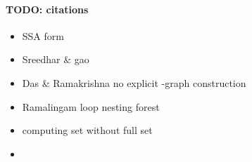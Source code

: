 {\paragraph{TODO: citations}
\begin{itemize}
  \item SSA form \cite{cfr}
  \item Sreedhar \& gao \cite{sreedhar_popl}
  \item Das \& Ramakrishna no explicit \DF-graph construction  \cite{das}
  \item Ramalingam loop nesting forest  \cite{rama}
  \item computing \iDF set without full \DF set \cite{sreedhar_popl,sreedharthesis}
  \item \cite{bilardi} 
\end{itemize}
}

